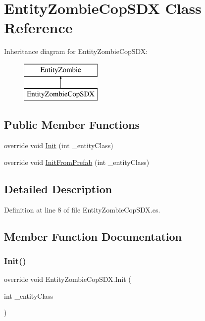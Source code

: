 \hypertarget{class_entity_zombie_cop_s_d_x}{}\section{Entity\+Zombie\+Cop\+S\+DX Class Reference}
\label{class_entity_zombie_cop_s_d_x}
Inheritance diagram for Entity\+Zombie\+Cop\+S\+DX\+:\begin{figure}[H]
\begin{center}
\leavevmode
\includegraphics[height=2.000000cm]{class_entity_zombie_cop_s_d_x}
\end{center}
\end{figure}
\subsection*{Public Member Functions}
\begin{DoxyCompactItemize}
\item 
override void \mbox{\hyperlink{class_entity_zombie_cop_s_d_x_a1395d94fa14c7e16a54068a14d357e8c}{Init}} (int \+\_\+entity\+Class)
\item 
override void \mbox{\hyperlink{class_entity_zombie_cop_s_d_x_af297cafb54a41a88d234b6943d4a283f}{Init\+From\+Prefab}} (int \+\_\+entity\+Class)
\end{DoxyCompactItemize}


\subsection{Detailed Description}


Definition at line 8 of file Entity\+Zombie\+Cop\+S\+D\+X.\+cs.



\subsection{Member Function Documentation}
\mbox{\label{class_entity_zombie_cop_s_d_x_a1395d94fa14c7e16a54068a14d357e8c}} 
\subsubsection{\texorpdfstring{Init()}{Init()}}
{\footnotesize\ttfamily override void Entity\+Zombie\+Cop\+S\+D\+X.\+Init (\begin{DoxyParamCaption}\item[{int}]{\+\_\+entity\+Class }\end{DoxyParamCaption})}



